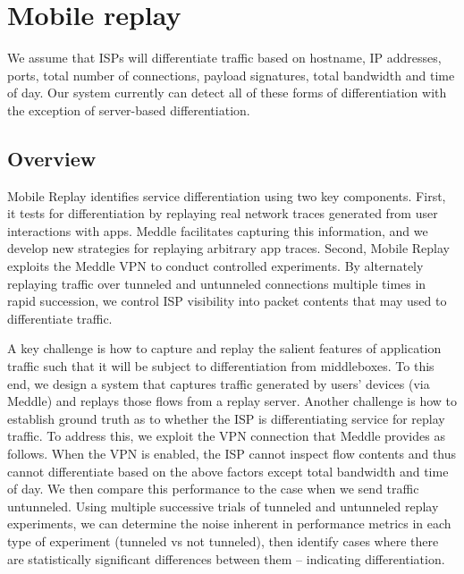 \documentclass[letterpaper]{sig-alternate-2013}
\begin{document}
\section{Mobile replay}
\label{sec:method}

We assume that ISPs will differentiate traffic based on hostname, IP addresses, ports, total number of connections, payload signatures, total bandwidth and time of day. Our system currently can detect all of these forms of differentiation with the exception of server-based differentiation.

\subsection{Overview} Mobile Replay identifies service differentiation using two key components. First, it tests for differentiation by replaying real network traces generated from user interactions with apps. Meddle \cite{meddle} facilitates capturing this information, and we develop new strategies for replaying arbitrary app traces. Second, Mobile Replay exploits the Meddle VPN to conduct controlled experiments. By alternately replaying traffic over tunneled and untunneled connections multiple times in rapid succession, we control ISP visibility into packet contents that may used to differentiate traffic.

A key challenge is how to capture and replay the salient features of application traffic such that it will be subject to differentiation from middleboxes. To this end, we design a system that captures traffic generated by users' devices (via Meddle) and replays those flows from a replay server. Another challenge is how to establish ground truth as to whether the ISP is differentiating service for replay traffic. To address this, we exploit the VPN connection that Meddle provides as follows. When the VPN is enabled, the ISP cannot inspect flow contents and thus cannot differentiate based on the above factors except total bandwidth and time of day. We then compare this performance to the case when we send traffic untunneled. Using multiple successive trials of tunneled and untunneled replay experiments, we can determine the noise inherent in performance metrics in each type of experiment (tunneled vs not tunneled), then identify cases where there are statistically significant differences between them -- indicating differentiation.
\end{document}
